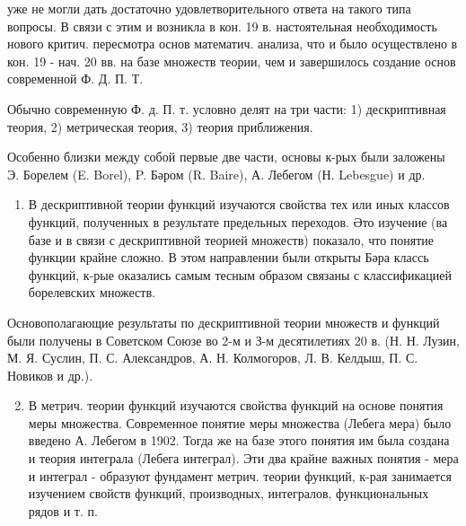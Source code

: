 \documentclass[10pt]{article}
\begin{document}
уже не могли дать достаточно удовлетворительного ответа на такого типа вопросы. В связи с этим и возникла в кон. 19 в. настоятельная необходимость нового критич. пересмотра основ математич. анализа, что и было осуществлено в кон. 19 - нач. 20 вв. на базе множеств теории, чем и завершилось создание основ современной Ф. Д. П. Т.



Обычно современную Ф. д. П. т. условно делят на три части: 1) дескриптивная теория, 2) метрическая теория, 3) теория приближения.



Особенно близки между собой первые две части, основы к-рых были заложены Э. Борелем (E. Borel), P. Бәром (R. Baire), А. Лебегом (Н. Lebesgue) и др.



\begin{enumerate}

  \item В дескриптивной теории функций изучаются свойства тех или иных классов функций, полученных в результате предельных переходов. Әто изучение (ва базе и в связи с дескриптивной теорией множеств) показало, что понятие функции крайне сложно. В этом направлении были открыты Бәра классь функций, к-рые оказались самым тесным образом связаны с классификацией борелевских множеств.

\end{enumerate}



Основополагающие результаты по дескриптивной теории множеств и функций были получены в Советском Союзе во 2-м и З-м десятилетиях 20 в. (Н. Н. Лузин, М. Я. Суслин, П. С. Александров, А. Н. Колмогоров, Л. В. Келдыш, П. С. Новиков и др.).



\begin{enumerate}

  \setcounter{enumi}{1}

  \item В метрич. теории функций изучаются свойства функций на основе понятия меры множества. Современное понятие меры множества (Лебега мера) было введено А. Лебегом в 1902. Тогда же на базе этого понятия им была создана и теория интеграла (Лебега интеграл). Эти два крайне важных понятия - мера и интеграл - образуют фундамент метрич. теории функций, к-рая занимается изучением свойств функций, производных, интегралов, функциональных рядов и т. п.

\end{enumerate}
\end{document}

